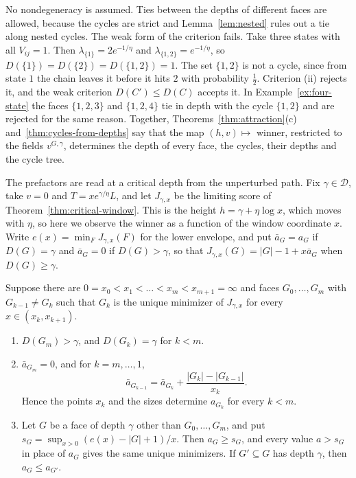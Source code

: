 No nondegeneracy is assumed. Ties between the depths of different faces are
allowed, because the cycles are strict and Lemma~\ref{lem:nested} rules out a
tie along nested cycles. The weak form of the criterion fails. Take three
states with all $V_{ij}=1$. Then $\lambda_{\{1\}}=2e^{-1/\eta}$ and
$\lambda_{\{1,2\}}=e^{-1/\eta}$, so $D(\{1\})=D(\{2\})=D(\{1,2\})=1$. The set
$\{1,2\}$ is not a cycle, since from state $1$ the chain leaves it before it
hits $2$ with probability $\frac12$. Criterion (ii) rejects it, and the weak
criterion $D(C')\le D(C)$ accepts it. In Example~\ref{ex:four-state} the faces
$\{1,2,3\}$ and $\{1,2,4\}$ tie in depth with the cycle $\{1,2\}$ and are
rejected for the same reason. Together, Theorems~\ref{thm:attraction}(c)
and~\ref{thm:cycles-from-depths} say that the map $(h,v)\mapsto$ winner,
restricted to the fields $v^{G,\gamma}$, determines the depth of every face, the
cycles, their depths and the cycle tree.

The prefactors are read at a critical depth from the unperturbed path. Fix
$\gamma\in\mathcal D$, take $v=0$ and $T=xe^{\gamma/\eta}L$, and let
$J_{\gamma,x}$ be the limiting score of Theorem~\ref{thm:critical-window}. This
is the height $h=\gamma+\eta\log x$, which moves with $\eta$, so here we
observe the winner as a function of the window coordinate $x$. Write
$e(x)=\min_FJ_{\gamma,x}(F)$ for the lower envelope, and put $\bar a_G=a_G$ if
$D(G)=\gamma$ and $\bar a_G=0$ if $D(G)>\gamma$, so that
$J_{\gamma,x}(G)=|G|-1+x\bar a_G$ when $D(G)\ge\gamma$.

\begin{theorem}\label{thm:window-prefactors}
Suppose there are $0=x_0<x_1<\dots<x_m<x_{m+1}=\infty$ and faces $G_0,\dots,G_m$
with $G_{k-1}\ne G_k$ such that $G_k$ is the unique minimizer of $J_{\gamma,x}$
for every $x\in(x_k,x_{k+1})$.
\begin{enumerate}
\item[(a)] $D(G_m)>\gamma$, and $D(G_k)=\gamma$ for $k<m$.
\item[(b)] $\bar a_{G_m}=0$, and for $k=m,\dots,1$,
\[
 \bar a_{G_{k-1}}=\bar a_{G_k}+\frac{|G_k|-|G_{k-1}|}{x_k}.
\]
Hence the points $x_k$ and the sizes determine $a_{G_k}$ for every $k<m$.
\item[(c)] Let $G$ be a face of depth $\gamma$ other than $G_0,\dots,G_m$, and put
$s_G=\sup_{x>0}(e(x)-|G|+1)/x$. Then $a_G\ge s_G$, and every value
$a>s_G$ in place of $a_G$ gives the same unique minimizers. If $G'\subseteq G$
has depth $\gamma$, then $a_G\le a_{G'}$.
\end{enumerate}
\end{theorem}

